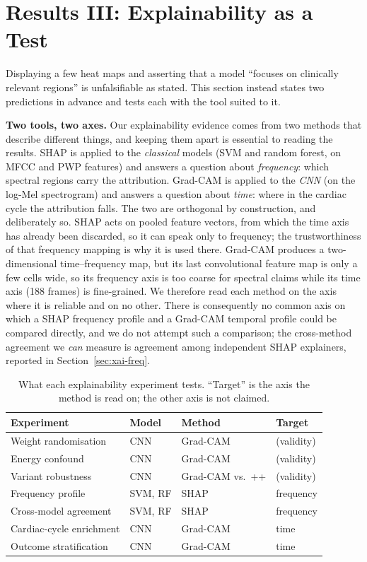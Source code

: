 \section{Results III: Explainability as a Test}
\label{sec:xai}

Displaying a few heat maps and asserting that a model ``focuses on clinically
relevant regions'' is unfalsifiable as stated. This section instead states two
predictions in advance and tests each with the tool suited to it.

\textbf{Two tools, two axes.} Our explainability evidence comes from two methods
that describe different things, and keeping them apart is essential to reading
the results. SHAP is applied to the \emph{classical} models (SVM and random
forest, on MFCC and PWP features) and answers a question about \emph{frequency}:
which spectral regions carry the attribution. Grad-CAM is applied to the
\emph{CNN} (on the log-Mel spectrogram) and answers a question about
\emph{time}: where in the cardiac cycle the attribution falls. The two are
orthogonal by construction, and deliberately so. SHAP acts on pooled feature
vectors, from which the time axis has already been discarded, so it can speak
only to frequency; the trustworthiness of that frequency mapping is why it is
used there. Grad-CAM produces a two-dimensional time--frequency map, but its
last convolutional feature map is only a few cells wide, so its frequency axis
is too coarse for spectral claims while its time axis (188 frames) is
fine-grained. We therefore read each method on the axis where it is reliable and
on no other. There is consequently no common axis on which a SHAP frequency
profile and a Grad-CAM temporal profile could be compared directly, and we do
not attempt such a comparison; the cross-method agreement we \emph{can} measure
is agreement among independent SHAP explainers, reported in
Section~\ref{sec:xai-freq}.

\begin{table}[t]
\centering
\caption{What each explainability experiment tests. ``Target'' is the axis the
method is read on; the other axis is not claimed.}
\label{tab:xai-map}
\setlength{\tabcolsep}{4pt}
\begin{tabular}{llll}
\toprule
Experiment & Model & Method & Target \\
\midrule
Weight randomisation & CNN & Grad-CAM & (validity) \\
Energy confound      & CNN & Grad-CAM & (validity) \\
Variant robustness   & CNN & Grad-CAM vs.\ ++ & (validity) \\
Frequency profile    & SVM, RF & SHAP & frequency \\
Cross-model agreement& SVM, RF & SHAP & frequency \\
Cardiac-cycle enrichment & CNN & Grad-CAM & time \\
Outcome stratification   & CNN & Grad-CAM & time \\
\bottomrule
\end{tabular}
\end{table}

